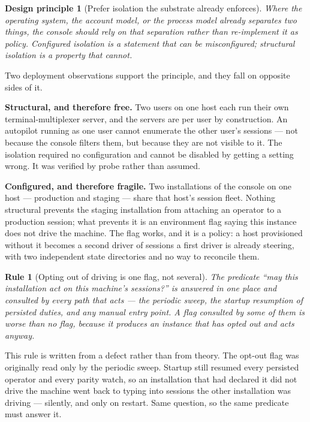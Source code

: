 \documentclass[11pt]{article}
\newtheorem{principle}{Design principle}
\newtheorem{drule}{Rule}
\begin{document}
\begin{principle}[Prefer isolation the substrate already enforces]
\label{prin:isolation}
Where the operating system, the account model, or the process model already separates two things, the console should rely on that separation rather than re-implement it as policy. Configured isolation is a statement that can be misconfigured; structural isolation is a property that cannot.
\end{principle}

Two deployment observations support the principle, and they fall on opposite sides of it.

\textbf{Structural, and therefore free.} Two users on one host each run their own terminal-multiplexer server, and the servers are per user by construction. An autopilot running as one user cannot enumerate the other user's sessions --- not because the console filters them, but because they are not visible to it. The isolation required no configuration and cannot be disabled by getting a setting wrong. It was verified by probe rather than assumed.

\textbf{Configured, and therefore fragile.} Two installations of the console on one host --- production and staging --- share that host's session fleet. Nothing structural prevents the staging installation from attaching an operator to a production session; what prevents it is an environment flag saying this instance does not drive the machine. The flag works, and it is a policy: a host provisioned without it becomes a second driver of sessions a first driver is already steering, with two independent state directories and no way to reconcile them.

\begin{drule}[Opting out of driving is one flag, not several]
\label{rule:onedrive}
The predicate ``may this installation act on this machine's sessions?'' is answered in one place and consulted by every path that acts --- the periodic sweep, the startup resumption of persisted duties, and any manual entry point. A flag consulted by some of them is worse than no flag, because it produces an instance that has opted out and acts anyway.
\end{drule}

This rule is written from a defect rather than from theory. The opt-out flag was originally read only by the periodic sweep. Startup still resumed every persisted operator and every parity watch, so an installation that had declared it did not drive the machine went back to typing into sessions the other installation was driving --- silently, and only on restart. Same question, so the same predicate must answer it.
\end{document}
